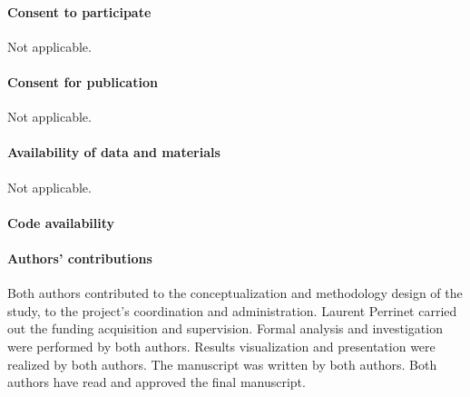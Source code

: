 \documentclass[default]{sn-jnl}%
\theoremstyle{thmstyleone}%
\theoremstyle{thmstyletwo}%
\theoremstyle{thmstylethree}%
\begin{document}
\paragraph{Consent to participate}
Not applicable.

\paragraph{Consent for publication}
Not applicable.

\paragraph{Availability of data and materials}
Not applicable.

\paragraph{Code availability}
%
\DataAvailability
%   
\paragraph{Authors' contributions}
% 
Both authors contributed to the conceptualization and methodology design of the study, to the project's coordination and administration. Laurent Perrinet carried out the funding acquisition and supervision. Formal analysis and investigation were performed by both authors. Results visualization and presentation were realized by both authors. The manuscript was written by both authors. Both authors have read and approved the final manuscript.


\end{document}
